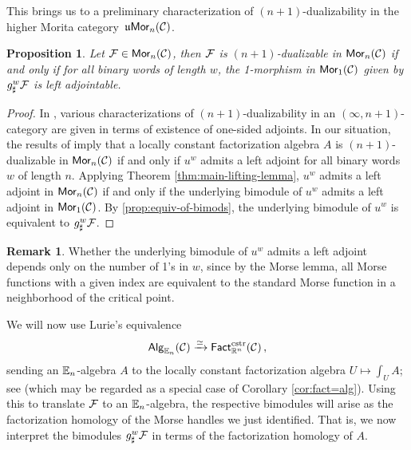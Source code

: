 \documentclass[10pt, reqno, twoside
, final
]{amsart}
\numberwithin{equation}{subsection}%
\theoremstyle{definition}
\theoremstyle{definition}
\theoremstyle{definition}
\theoremstyle{definition}
\theoremstyle{definition}
\theoremstyle{definition}
\theoremstyle{definition}
\theoremstyle{definition}
\theoremstyle{definition}
\theoremstyle{plain}
\theoremstyle{definition}
\theoremstyle{plain}
\theoremstyle{definition}
\theoremstyle{plain}
\theoremstyle{definition}
\newtheorem{rmk}[defn]{Remark}
\theoremstyle{definition}
\theoremstyle{plain}
\theoremstyle{plain}
\theoremstyle{definition}
\theoremstyle{plain}
\theoremstyle{plain}
\newtheorem{prop}[defn]{Proposition}
\theoremstyle{plain}
\begin{document}
This brings us to a preliminary characterization of $(n+1)$-dualizability in the higher Morita category~$\mathfrak{u}\mathsf{Mor}_{n}(\mathcal{C})$.

\begin{prop}\label{prop:first-n+1-dual}
Let $\mathcal{F} \in \mathsf{Mor}_{n}(\mathcal{C})$, then $\mathcal{F}$ is $(n+1)$-dualizable in $\mathsf{Mor}_{n}(\mathcal{C})$ if and only if for all binary words of length $w$, the 1-morphism in $\mathsf{Mor}_{1}(\mathcal{C})$ given by $g^w_{\sharp}\mathcal{F}$ is left adjointable.
\end{prop}

\begin{proof}
In \cite{Araujo-thesis, SS25}, various characterizations of $(n+1)$-dualizability in an $(\infty, n+1)$-category are given in terms of existence of one-sided adjoints. 
In our situation, the results of \cite{Araujo-thesis} imply that a locally constant factorization algebra $A$ is $(n+1)$-dualizable in $\mathsf{Mor}_n(\mathcal{C})$ if and only if $u^w$ admits a left adjoint for all binary words $w$ of length $n$.
Applying Theorem \ref{thm:main-lifting-lemma}, $u^w$ admits a left adjoint in $\mathsf{Mor}_n(\mathcal{C})$ if and only if the underlying bimodule of $u^w$ admits a left adjoint in $\mathsf{Mor}_1(\mathcal{C})$. By \cref{prop:equiv-of-bimods}, the underlying bimodule of $u^w$ is equivalent to $g^w_{\sharp}\mathcal{F}$.
\end{proof}

\begin{rmk}
Whether the underlying bimodule of $u^w$ admits a left adjoint depends only on the number of 1's in $w$, since by the Morse lemma, all Morse functions with a given index are equivalent to the standard Morse function in a neighborhood of the critical point.
\end{rmk}

We will now use Lurie's equivalence
\begin{equation}\label{eqn:Lurie_E_n}
   \mathsf{Alg}_{\mathbb{E}_n}(\mathcal{C}) \xrightarrow{\simeq} \mathsf{Fact}^{\mathrm{cstr}}_{\mathbb{R}^n}(\mathcal{C}) \,, 
\end{equation}
sending an $\mathbb{E}_n$-algebra $A$ to the locally constant factorization algebra $U \mapsto \int_U A$; see \cite[Section 5.4.2]{LurHA} (which may be regarded as a special case of Corollary \ref{cor:fact=alg}). Using this to translate $\mathcal{F}$ to an $\mathbb{E}_n$-algebra, the respective bimodules will arise as the factorization homology of the Morse handles we just identified.
That is, we now interpret the bimodules $g^{w}_{\sharp}\mathcal{F}$ in terms of the factorization homology of $A$.
\end{document}
